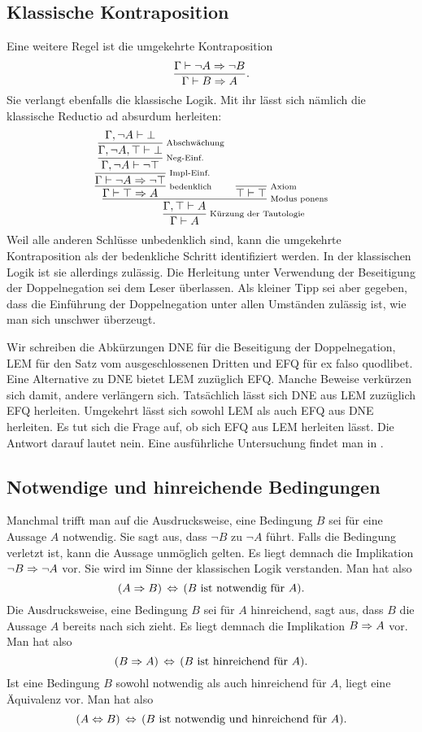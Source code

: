 \subsection{Klassische Kontraposition}

Eine weitere Regel ist die umgekehrte Kontraposition
\[\dfrac{\Gamma\vdash\lnot A\Rightarrow\lnot B}{\Gamma\vdash B\Rightarrow A}.\]
Sie verlangt ebenfalls die klassische Logik. Mit ihr lässt sich
nämlich die klassische Reductio ad absurdum herleiten:
\[
\infer[\infernote{Kürzung der Tautologie}]{\Gamma\vdash A}{
  \infer[\infernote{Modus ponens}]{\Gamma,\top\vdash A}{
    \infer[\infernote{bedenklich}]{\Gamma\vdash\top\cond A}{
      \infer[\infernote{Impl-Einf.}]{\Gamma\vdash\lnot A\cond\lnot\top}{
        \infer[\infernote{Neg-Einf.}]{\Gamma,\lnot A\vdash\lnot\top}{
          \infer[\infernote{Abschwächung}]{\Gamma,\lnot A,\top\vdash\bot}{
            \Gamma,\lnot A\vdash\bot}}}}
  & \infer[\infernote{Axiom}]{\top\vdash\top}{}}}
\]
Weil alle anderen Schlüsse unbedenklich sind, kann die umgekehrte
Kontraposition als der bedenkliche Schritt identifiziert werden.
In der klassischen Logik ist sie allerdings zulässig. Die Herleitung
unter Verwendung der Beseitigung der Doppelnegation sei dem Leser
überlassen. Als kleiner Tipp sei aber gegeben, dass die Einführung
der Doppelnegation unter allen Umständen zulässig ist, wie man sich
unschwer überzeugt.

Wir schreiben die Abkürzungen DNE für die Beseitigung der
Doppelnegation, LEM für den Satz vom ausgeschlossenen Dritten
und EFQ für ex falso quodlibet. Eine Alternative zu DNE bietet
LEM zuzüglich EFQ. Manche Beweise verkürzen sich damit, andere
verlängern sich. Tatsächlich lässt sich DNE aus LEM zuzüglich EFQ
herleiten. Umgekehrt lässt sich sowohl LEM als auch EFQ aus DNE
herleiten. Es tut sich die Frage auf, ob sich EFQ aus LEM herleiten
lässt. Die Antwort darauf lautet nein. Eine ausführliche Untersuchung
findet man in \cite{Diener}.

\subsection{Notwendige und hinreichende Bedingungen}

Manchmal trifft man auf die Ausdrucksweise, eine Bedingung $B$ sei für
eine Aussage $A$ notwendig. Sie sagt aus, dass $\lnot B$ zu $\lnot A$
führt. Falls die Bedingung verletzt ist, kann die Aussage unmöglich
gelten. Es liegt demnach die Implikation $\lnot B\Rightarrow\lnot A$ vor.
Sie wird im Sinne der klassischen Logik verstanden. Man hat also
\[(A\Rightarrow B)\,\Leftrightarrow\, (\text{$B$ ist notwendig für $A$}).\]
Die Ausdrucksweise, eine Bedingung $B$ sei für $A$ hinreichend,
sagt aus, dass $B$ die Aussage $A$ bereits nach sich zieht. Es liegt
demnach die Implikation $B\Rightarrow A$ vor. Man hat also
\[(B\Rightarrow A)\,\Leftrightarrow\, (\text{$B$ ist hinreichend für $A$}).\]
Ist eine Bedingung $B$ sowohl notwendig als auch hinreichend für $A$,
liegt eine Äquivalenz vor. Man hat also
\[(A\Leftrightarrow B)\,\Leftrightarrow\, (\text{$B$ ist notwendig und hinreichend für $A$}).\]

